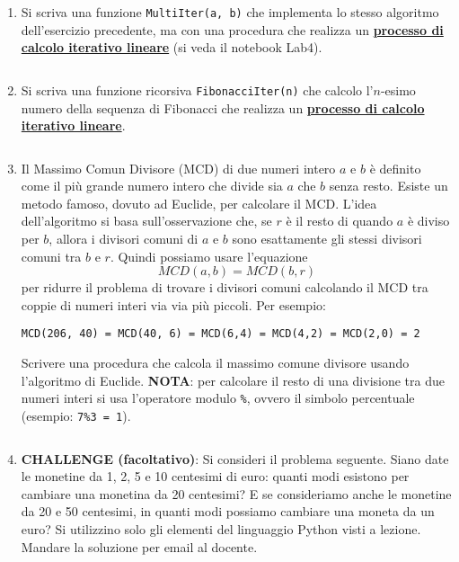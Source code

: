 \documentclass[11pt,a4]{article}
\newcommand{\mybox}[2]{$\quad$\fbox{
\begin{minipage}{#1cm}
\hfill\vspace{#2cm}
\end{minipage}
}}
\begin{document}
\begin{enumerate}
{\bf NOTA}: In Python per effettuare la divisione intera tra due numeri si usa l'operatore {\tt //} (e.g. {\tt 3 // 2 = 1}).
Per calcolare il resto di una divisione si usa l'operatore modulo {\tt \%} (e.g. {\tt 7\%4 = 3}). 
Si osservi che un numero {\tt x} è pari solo se {\tt x \% 2 == 0}.

\mybox{15}{3.5}

\item Si scriva una funzione {\tt MultiIter(a, b)} che implementa lo stesso algoritmo dell'esercizio precedente, ma con una procedura che realizza
un {\underline {\bf processo di calcolo iterativo lineare}} (si veda il notebook Lab4).

\mybox{15}{3.5}


\item Si scriva una funzione ricorsiva {\tt FibonacciIter(n)} che calcolo l'$n$-esimo numero della sequenza di Fibonacci
che realizza un {\underline {\bf processo di calcolo iterativo lineare}}.

\mybox{15}{3.5}

\item Il Massimo Comun Divisore (MCD) di due numeri intero $a$ e $b$ è definito come 
il più grande numero intero che divide sia $a$ che $b$ senza resto. 
Esiste un metodo famoso, dovuto ad Euclide, per calcolare il MCD.
L'idea dell'algoritmo si basa sull'osservazione che, se $r$ è il resto di quando $a$ è diviso per $b$, 
allora i divisori comuni di $a$ e $b$ sono esattamente gli stessi divisori comuni tra $b$ e $r$. 
Quindi possiamo usare l'equazione $$MCD(a,b) = MCD(b,r)$$ per ridurre il problema di 
trovare i divisori comuni calcolando il MCD tra coppie di numeri interi via via più piccoli. Per esempio:

\begin{verbatim}
MCD(206, 40) = MCD(40, 6) = MCD(6,4) = MCD(4,2) = MCD(2,0) = 2
\end{verbatim}

Scrivere una procedura che calcola il massimo comune divisore usando l'algoritmo di Euclide.
{\bf NOTA}: per calcolare il resto di una divisione tra due numeri interi si usa l'operatore modulo {\tt \%}, 
ovvero il simbolo percentuale (esempio: {\tt 7\%3 = 1}).

\mybox{15}{3.5}

\item {\bf CHALLENGE (facoltativo)}: Si consideri il problema seguente. Siano date le monetine
da 1, 2, 5 e 10 centesimi di euro: quanti modi esistono per cambiare una monetina da 20 centesimi?
E se consideriamo anche le monetine da 20 e 50 centesimi, 
in quanti modi possiamo cambiare una moneta da un euro? 
Si utilizzino solo gli elementi del linguaggio Python visti a lezione. Mandare la soluzione per email al docente.

\end{enumerate}
\end{document}

